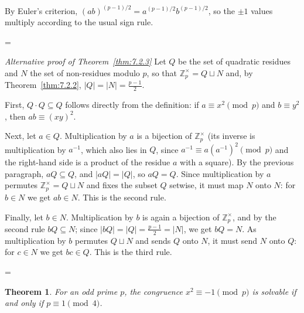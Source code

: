 \documentclass[11pt]{article}
\makeatletter
\theoremstyle{ntstyle}
\newtheorem{theorem}{Theorem}[subsection]
\let\nt@closedisplay\]
\def\nt@guardedclose{\@ifnextchar\par{\nt@closeafterpar}{\@ifnextchar\end{\postdisplaypenalty\@M\nt@closedisplay}{\nt@closedisplay}}}
\def\nt@closeafterpar\par{\@ifnextchar\par{\nt@closeafterpar}{\@ifnextchar\end{\postdisplaypenalty\@M\nt@closedisplay\par}{\nt@closedisplay\par}}}
\renewenvironment{proof}[1][\proofname]{\par
  \pushQED{\qed}\normalfont\topsep\medskipamount\edef\nt@afterproof{\@endparpenalty=\the\@endparpenalty\relax}\@beginparpenalty\@M\@endparpenalty\@M\let\]\nt@guardedclose\trivlist\item[]\textit{#1\@addpunct{.}} \ignorespaces}{\ifvmode\addpenalty\@M\fi\popQED\nt@afterproof\endtrivlist\@endpefalse}
\newenvironment{altproof}[1][\proofname]{\begin{proof}[#1]\renewcommand{\qedsymbol}{}}{\end{proof}}
\newcommand{\ZmodUnits}[1]{\mathbb{Z}_{#1}^{\times}}
\makeatother
\begin{document}
\begin{proof} By Euler's criterion, $(ab)^{(p-1)/2} =
		a^{(p-1)/2} b^{(p-1)/2}$, so the $\pm 1$ values multiply according to the usual sign rule.

\end{proof}
\begin{altproof}[Alternative proof of Theorem~\ref{thm:7.2.3}] Let
	$Q$ be the set of quadratic residues and $N$ the set of non-residues
	modulo $p$, so that $\ZmodUnits{p} = Q \sqcup N$ and, by
	Theorem~\ref{thm:7.2.2}, $|Q| = |N| = \tfrac{p-1}{2}$.

	First, $Q \cdot Q \subseteq Q$ follows directly from the definition: if $a
		\equiv x^{2} \pmod{p}$ and $b \equiv y^{2}$, then $ab \equiv (xy)^{2}$.

	Next, let $a \in Q$. Multiplication by $a$ is a bijection of
	$\ZmodUnits{p}$ (its inverse is multiplication by $a^{-1}$,
	which also lies in $Q$, since $a^{-1} \equiv a(a^{-1})^{2} \pmod{p}$ and the right-hand side is a
		product of the residue $a$ with a square). By the previous paragraph,
	$aQ \subseteq Q$, and $|aQ| = |Q|$, so $aQ = Q$. Since multiplication
		by $a$ permutes $\ZmodUnits{p} = Q \sqcup N$ and fixes the
		subset $Q$ setwise, it must map $N$ onto $N$: for $b \in N$ we get $ab
	\in N$. This is the second rule.

		Finally, let $b \in N$. Multiplication by $b$ is again a bijection of
	$\ZmodUnits{p}$, and by the second rule $bQ \subseteq N$;
		since $|bQ| = |Q| = \tfrac{p-1}{2} = |N|$, we get $bQ = N$. As
		multiplication by $b$ permutes $Q \sqcup N$ and sends $Q$ onto $N$, it
		must send $N$ onto $Q$: for $c \in N$ we get $bc \in Q$. This is the
	third rule.

\end{altproof}
\begin{theorem}\label{thm:7.2.4} For an odd
	prime $p$, the congruence $x^{2} \equiv -1 \pmod{p}$ is solvable if and
	only if $p \equiv 1 \pmod{4}$.

\end{theorem}
\end{document}

